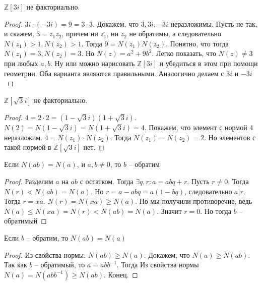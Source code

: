 \documentclass{article}
\begin{document}
\begin{statement}
    $\mathbb{Z}[3i]$ не факториально.
\end{statement}

\begin{proof}
    $3i \cdot (-3i) = 9 = 3 \cdot 3$. Докажем, что $3, 3i, -3i$ неразложимы. Пусть не так, и скажем, $3 = z_1 z_2$,
    причем ни $z_1$, ни $z_2$ не обратимы, а следовательно $N(z_1) > 1, N(z_2) > 1$.
    Тогда $9 = N(z_1) N(z_2)$. Понятно, что тогда $N(z_1) = 3, N(z_2) = 3$. Но $N(z) = a^2 + 9b^2$. Легко показать, что
    $N(z) \neq 3$ при любых $a, b$. Ну или можно нарисовать $\mathbb{Z}[3i]$ и убедиться в этом при помощи геометрии.
    Оба варианта являются правильными. Аналогично делаем с $3i$ и $-3i$
\end{proof}

\begin{statement}
    $\mathbb{Z}[\sqrt{3}i]$ не факториально.
\end{statement}

\begin{proof}
    $4 = 2 \cdot 2 = (1 - \sqrt{3}i)(1 + \sqrt{3}i)$. $N(2) = N(1 - \sqrt{3}i) = N(1 + \sqrt{3}i) = 4$. Покажем, что
    элемент с нормой 4 неразложим. $4 = N(z_1) \cdot N(z_2)$. Тогда $N(z_1) = N(z_2) = 2$. Но элементов с такой нормой в
    $\mathbb{Z}[\sqrt{3}i]$ нет.
\end{proof}

\begin{statement}
    Если $N(ab) = N(a)$, и $a, b \neq 0$, то $b$ -- обратим
\end{statement}

\begin{proof}
    Разделим $a$ на $ab$ с остатком. Тогда $\exists q, r: a = abq + r$. Пусть $r \neq 0$. Тогда $N(r) < N(ab) = N(a)$.
    Но $r = a - abq = a (1 - bq)$, следовательно $a | r$. Тогда $r = xa$. $N(r) = N(xa) \geq N(a)$. Но мы получили
    противоречие, ведь $N(a) \leq N(xa) = N(r) < N(ab) = N(a)$. Значит $r = 0$. Но тогда $b$ -- обратимый
\end{proof}

\begin{statement}
    Если $b$ -- обратим, то $N(ab) = N(a)$
\end{statement}

\begin{proof}
    Из свойства нормы: $N(ab) \geq N(a)$. Докажем, что $N(a) \geq N(ab)$. Так как $b$ -- обратимый, то $a = a b
    b^{-1}$. Тогда Из свойства нормы $N(a) = N(abb^{-1}) \geq N(ab)$. Конец.
\end{proof}
\end{document}
